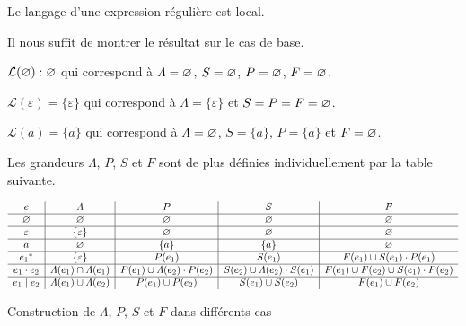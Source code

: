 \begin{prop}
	Le langage d'une expression régulière est local.
\end{prop}

\begin{prv}
	Il nous suffit de montrer le résultat sur le cas de base.

	$\mathcal{L}(\varnothing) : \varnothing$\/ qui correspond à $\varLambda = \varnothing$, $S = \varnothing$, $P = \varnothing$, $F = \varnothing$.

	$\mathcal{L}(\varepsilon) = \{\varepsilon\}$\/ qui correspond à $\Lambda = \{\varepsilon\}$\/ et $S = P = F = \varnothing$.

	$\mathcal{L}(a) = \{a\}$\/ qui correspond à $\varLambda = \varnothing$, $S = \{a\}$, $P = \{a\}$\/ et $F = \varnothing$.
\end{prv}

\begin{rmk}
	Les grandeurs $\Lambda$, $P$, $S$\/ et $F$\/ sont de plus définies individuellement par la table suivante.

	\begin{table}[H]
		\centering
			\[
				\begin{array}{c|c|c|c|c}
					e&\varLambda&P&S&F\\\hline
					\varnothing&\varnothing&\varnothing&\varnothing&\varnothing\\ \hline
					\varepsilon&\{\varepsilon\}&\varnothing&\varnothing&\varnothing\\ \hline
					a&\varnothing&\{a\}&\{a\}&\varnothing\\ \hline
					{e_1}^*& \{\varepsilon\}&P(e_1)&S(e_1)&F(e_1) \cup S(e_1) \cdot P(e_1)\\ \hline
					e_1 \cdot e_2& \varLambda(e_1) \cap \varLambda(e_1)&P(e_1) \cup \varLambda(e_2)\cdot P(e_2)&S(e_2) \cup \varLambda(e_2) \cdot S(e_1)&F(e_1)\cup F(e_2) \cup S(e_1) \cdot P(e_2)\\ \hline
					e_1 \mid e_2& \varLambda(e_1) \cup \varLambda(e_2)&P(e_1) \cup P(e_2)&S(e_1)\cup S(e_2)&F(e_1) \cup F(e_2)
				\end{array}
			\]
		\caption{Construction de $\Lambda$, $P$, $S$ et $F$ dans différents cas}
	\end{table}
\end{rmk}


